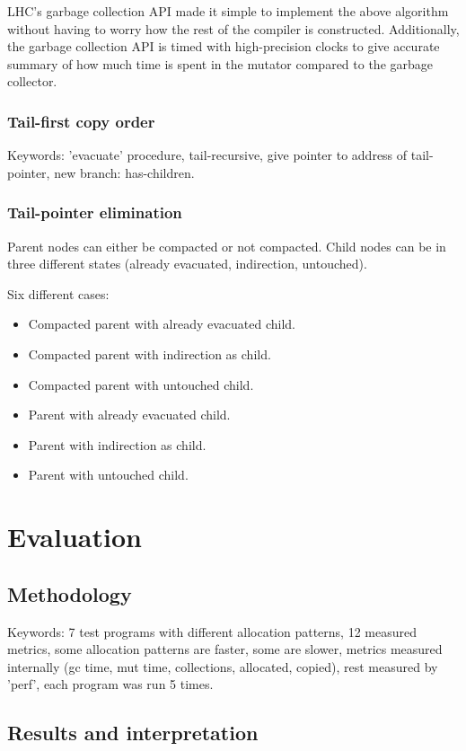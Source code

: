 \documentclass[a4paper,oneside]{memoir}
\begin{document}
LHC's garbage collection API made it simple to implement the above algorithm
without having to worry how the rest of the compiler is constructed.
Additionally, the garbage collection API is timed with high-precision clocks
to give accurate summary of how much time is spent in the mutator compared to
the garbage collector.

\subsection{Tail-first copy order}

Keywords: 'evacuate' procedure, tail-recursive, give pointer to address of
tail-pointer, new branch: has-children.

\subsection{Tail-pointer elimination}

Parent nodes can either be compacted or not compacted. Child nodes can be in
three different states (already evacuated, indirection, untouched).

Six different cases:
\begin{itemize}
  \item Compacted parent with already evacuated child.
  \item Compacted parent with indirection as child.
  \item Compacted parent with untouched child.
  \item Parent with already evacuated child.
  \item Parent with indirection as child.
  \item Parent with untouched child.
\end{itemize}

\chapter{Evaluation}

\section{Methodology}
Keywords: 7 test programs with different allocation patterns, 12 measured metrics,
some allocation patterns are faster, some are slower, metrics measured internally
(gc time, mut time, collections, allocated, copied), rest measured
by 'perf', each program was run 5 times.

\section{Results and interpretation}
\end{document}
